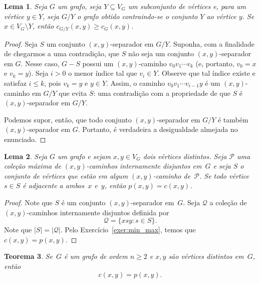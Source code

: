 \documentclass[12pt, a4paper]{article}
\newtheorem{teor}{Teorema}[section]
\newtheorem{lema}[teor]{Lema}
\theoremstyle{definition}
\begin{document}
\begin{lema}
\label{lema:c_contracted}
Seja $G$ um grafo, seja $Y \subseteq V_G$ um subconjunto de vértices e, para um vértice $y \in Y$, seja $G/Y$ o grafo obtido contraindo-se o conjunto $Y$ ao vértice $y$. Se $x \in V_G \setminus Y$, então $c_{G/Y}(x,y) \geq c_G(x,y)$.
\end{lema}

\begin{proof}
  Seja $S$ um conjunto $(x,y)$-separador em $G/Y$. Suponha, com a finalidade de chegarmos a uma contradição, que $S$ não seja um conjunto $(x,y)$-separador em $G$. Nesse caso, $G - S$ possui um $(x,y)$-caminho $v_0 v_1 \cdots v_k$ (e, portanto, $v_0 = x$ e $v_k = y$). Seja $i > 0$ o menor índice tal que $v_i \in Y$. Observe que tal índice existe e satisfaz $i \leq k$, pois $v_k = y$ e $y \in Y$. Assim, o caminho $v_0 v_1 \cdots v_{i-1} y$ é um $(x,y)$-caminho em $G/Y$ que evita $S$: uma contradição com a propriedade de que $S$ é $(x,y)$-separador em $G/Y$. 

Podemos supor, então, que todo conjunto $(x,y)$-separador em $G/Y$ é também $(x,y)$-separador em $G$. Portanto, é verdadeira a desigualdade almejada no enunciado.
\end{proof}

\begin{lema}
\label{lema:all_paths_size_2}
Seja $G$ um grafo e sejam $x,y \in V_G$ dois vértices distintos. Seja $\mathcal{P}$ uma coleção máxima de $(x,y)$-caminhos internamente disjuntos em~$G$ e seja $S$ o conjunto de vértices que estão em algum $(x,y)$-caminho de~$\mathcal{P}$. Se todo vértice $s \in S$ é adjacente a ambos~$x$ e~$y$, então $p(x,y) = c(x,y)$.
\end{lema}

\begin{proof}
Note que $S$ é um conjunto $(x,y)$-separador em~$G$. Seja $\mathcal{Q}$ a coleção de $(x,y)$-caminhos internamente disjuntos definida por
\[ \mathcal{Q} = \{xsy \colon s \in S\}. \]
Note que $|S| = |\mathcal{Q}|$. Pelo Exercício~\ref{exer:min_max}, temos que $c(x,y) = p(x,y)$.
\end{proof}


\begin{teor}
\label{teor:menger}
Se~$G$ é um grafo de ordem $n \geq 2$ e $x,y$ são vértices distintos em~$G$, então
\begin{equation}
  \label{eq:min_max_conn2}
  c(x,y) = p(x,y).
\end{equation}
\end{teor}
\end{document}
